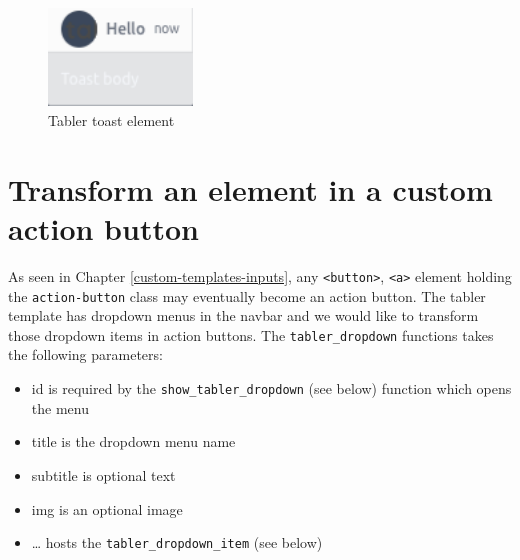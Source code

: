 \documentclass[
]{book}
\providecommand{\tightlist}{%
  \setlength{\itemsep}{0pt}\setlength{\parskip}{0pt}}
\begin{document}
\begin{figure}
\includegraphics[width=1.51in]{images/practice/tabler-toast} \caption{Tabler toast element}\label{fig:tabler-toast}
\end{figure}

\hypertarget{transform-an-element-in-a-custom-action-button}{%
\section{Transform an element in a custom action button}\label{transform-an-element-in-a-custom-action-button}}

As seen in Chapter \ref{custom-templates-inputs}, any \texttt{\textless{}button\textgreater{}}, \texttt{\textless{}a\textgreater{}} element holding the \texttt{action-button} class may eventually become an action button. The tabler template has dropdown menus in the navbar and we would like to transform those dropdown items in action buttons. The \texttt{tabler\_dropdown} functions takes the following parameters:

\begin{itemize}
\tightlist
\item
  id is required by the \texttt{show\_tabler\_dropdown} (see below) function which opens the menu
\item
  title is the dropdown menu name
\item
  subtitle is optional text
\item
  img is an optional image
\item
  \ldots{} hosts the \texttt{tabler\_dropdown\_item} (see below)
\end{itemize}
\end{document}
